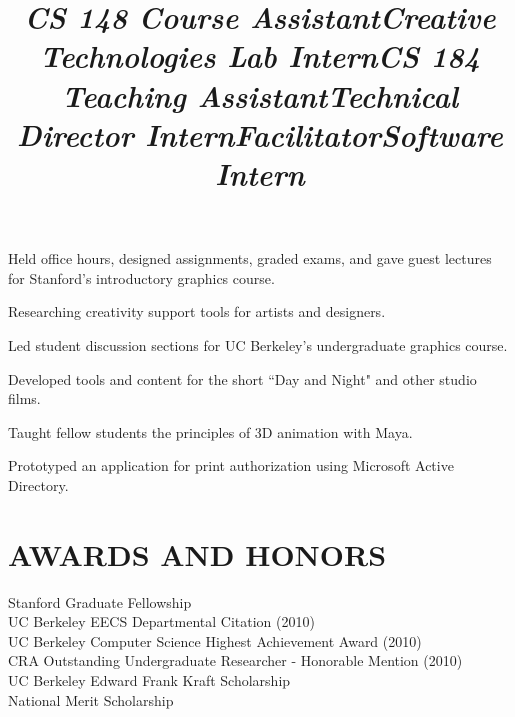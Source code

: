 \documentclass[line,margin]{res}
\begin{document}
\begin{resume}
\title{{\sl CS 148 Course Assistant}}
\begin{position}
Held office hours, designed assignments, graded exams, and gave guest lectures for Stanford's introductory graphics course.
\end{position}

\title{{\sl Creative Technologies Lab Intern}}
\begin{position}
Researching creativity support tools for artists and designers.
\end{position}

\title{{\sl CS 184 Teaching Assistant}}
\begin{position}
Led student discussion sections for UC Berkeley's undergraduate graphics course.
\end{position}

\title{{\sl Technical Director Intern}}
\begin{position}
Developed tools and content for the short ``Day and Night" and other studio films.
\end{position}

\title{{\sl Facilitator}}
\begin{position}
Taught fellow students the principles of 3D animation with Maya.
\end{position}

\title{{\sl Software Intern}}
\begin{position}
Prototyped an application for print authorization using Microsoft Active Directory.
\end{position}


\section{AWARDS AND HONORS}
Stanford Graduate Fellowship \\ 
UC Berkeley EECS Departmental Citation (2010) \\
UC Berkeley Computer Science Highest Achievement Award (2010) \\
CRA Outstanding Undergraduate Researcher - Honorable Mention (2010) \\
UC Berkeley Edward Frank Kraft Scholarship \\
National Merit Scholarship 

\end{resume}
\end{document}
